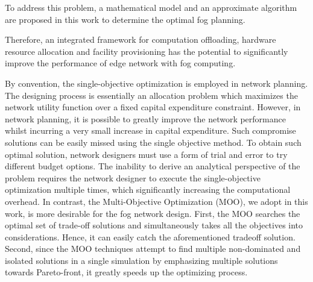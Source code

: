 \documentclass[10pt,journal,compsoc]{IEEEtran}
\begin{document}
To address this problem, a mathematical model and an approximate algorithm are proposed in this work to determine the optimal fog planning. 



Therefore, an integrated framework for computation offloading, hardware resource allocation and facility provisioning has the potential to significantly improve the performance of edge network with fog computing.

By convention, the single-objective optimization is employed in network planning. The designing process is essentially an allocation problem which maximizes the network utility function over a fixed capital expenditure constraint. 
However, in network planning, it is possible to greatly improve the network performance whilst incurring a very small increase in capital expenditure. Such compromise solutions can be easily missed using the single objective method. To obtain such optimal solution, network designers must use a form of trial and error to try different budget options. The inability to derive an analytical perspective of the problem requires the network designer to execute the single-objective optimization multiple times, which significantly increasing the computational overhead. 
In contrast, the Multi-Objective Optimization (MOO), we adopt in this work, is more desirable for the fog network design. First, the MOO searches the optimal set of trade-off solutions and simultaneously takes all the objectives into considerations. Hence, it can easily catch the aforementioned tradeoff solution.
Second, since the MOO techniques attempt to find multiple non-dominated and isolated solutions in a single simulation by emphasizing multiple solutions towards Pareto-front, it greatly speeds up the optimizing process. 
\end{document}
